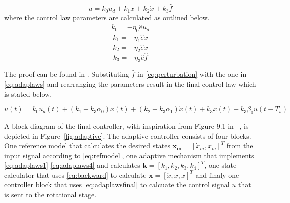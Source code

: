 \begin{equation}
  \label{eq:adaplaws}
  u = k_0u_d + k_1x + k_2\dot{x} + k_3\hat{f}
\end{equation}
where the control law parameters are calculated as outlined below.
\begin{equation}
  \label{eq:adaplaws1}
  \dot{k}_0 = -\eta_0\hat{e}u_d
\end{equation}
\begin{equation}
  \label{eq:adaplaws2}
  \dot{k}_1 = -\eta_1\hat{e}x
\end{equation}
\begin{equation}
  \label{eq:adaplaws3}
  \dot{k}_2 = -\eta_2\hat{e}\dot{x}
\end{equation}
\begin{equation}
  \label{eq:adaplaws4}
  \dot{k}_3 = -\eta_3\hat{e}\hat{f}
\end{equation}

The proof can be found in \citep{Qingson:2016}. Substituting $\hat{f}$ in \eqref{eq:perturbation} with the one in \eqref{eq:adaplaws} and rearranging the parameters result in the final \abbrMRACPE control law which is stated below.

\begin{equation}
    \label{eq:adaplawsfinal}
  u(t) = k_0u_d(t) + (k_1 + k_3\alpha_0)x(t) +  (k_2 + k_3\alpha_1)\dot{x}(t) + k_3\ddot{x}(t) - k_3\beta_0u(t-T_s)
\end{equation}

A block diagram of the final controller, with inspiration from Figure 9.1 in ~\citep{Qingson:2016}, is depicted in Figure~\ref{fig:adaptive}. The adaptive controller consists of four blocks. One reference model that calculates the desired states $\mathbf{x_m}=[\dot{x}_m, x_m]^T$ from the input signal according to \eqref{eq:refmodel}, one adaptive mechanism that implements \eqref{eq:adaplaws1}-\eqref{eq:adaplaws4} and calculates $\mathbf{k}=[k_1, k_2, k_3, k_4]^T$, one state calculator that uses \eqref{eq:backward} to calculate $\mathbf{x}=[\ddot{x}, \dot{x}, x]^T$ and finaly one controller block that uses \eqref{eq:adaplawsfinal} to calcuate the control signal $u$ that is sent to the rotational stage.

